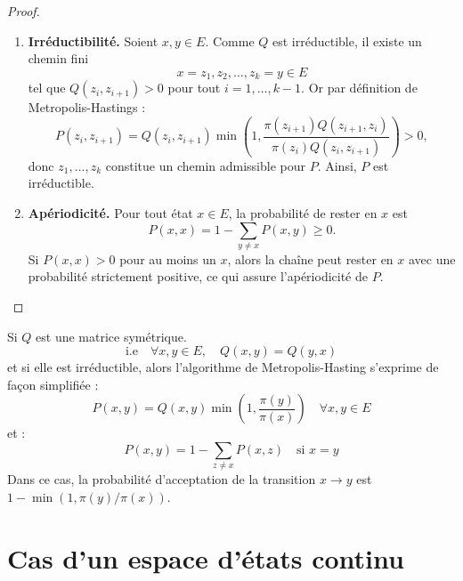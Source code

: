 \begin{proof}
    \begin{enumerate}[label=\roman*)]
        \item \textbf{Irréductibilité.}  
            Soient $x, y \in E$. Comme $Q$ est irréductible, il existe un chemin fini
            $$ x = z_1, z_2, \dots, z_k = y \in E $$
            tel que $Q(z_i, z_{i+1}) > 0$ pour tout $i = 1, \dots, k-1$.  
            Or par définition de Metropolis-Hastings :
            $$ P(z_i, z_{i+1}) = Q(z_i, z_{i+1}) \min \left( 1, \frac{\pi(z_{i+1}) Q(z_{i+1}, z_i)}{\pi(z_i) Q(z_i, z_{i+1})} \right) > 0, $$
            donc $z_1, \dots, z_k$ constitue un chemin admissible pour $P$. Ainsi, $P$ est irréductible.
            
        \item \textbf{Apériodicité.}  
            Pour tout état $x \in E$, la probabilité de rester en $x$ est
            $$ P(x,x) = 1 - \sum_{y \neq x} P(x,y) \ge 0. $$
            Si $P(x,x) > 0$ pour au moins un $x$, alors la chaîne peut rester en $x$ avec une probabilité strictement positive, ce qui assure l'apériodicité de $P$.
    \end{enumerate}
\end{proof}

\begin{remark}
    Si $Q$ est une matrice symétrique. 
        $$ \text{i.e} \quad \forall x, y \in E, \quad Q(x,y) = Q(y,x) $$ 
    et si elle est irréductible, alors l'algorithme de Metropolis-Hasting s'exprime de façon 
    simplifiée : 
        $$ P(x,y) = Q(x,y) \min \left(1, \frac{ \pi(y)}{ \pi(x)}\right) \quad \forall x,y \in E $$ 
    et : 
        $$ P(x,y) = 1 -  \sum_{z \neq x} P(x,z) \quad \text{si } x = y $$   
    Dans ce cas, la probabilité d'acceptation de la transition $ x \to y$ est $ 1 - \min \left(1, \pi(y) / \pi(x)\right)$. 
\end{remark}



\section{Cas d'un espace d'états continu}

